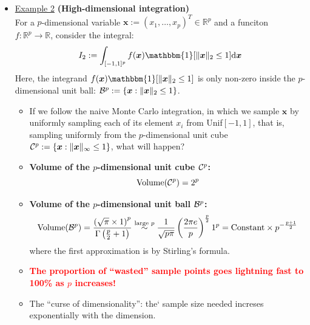 \documentclass[12pt]{article}
\begin{document}
\begin{itemize}
	\item \underline{Example 2} {\bf (High-dimensional integration)}\\
	For a $p$-dimensional variable $\bm{x}:=(x_1, \ldots, x_p)^T\in\mathbb{R}^p$ and a funciton $f:\mathbb{R}^p\to\mathbb{R}$, consider the integral:
	$$
	I_2:= \int_{[-1,1]^p} f(\bm{x})\mathbbm{1}[\|\bm{x}\|_2\leq 1] \textrm{d}\bm{x}
	$$
	Here, the integrand $f(\bm{x})\mathbbm{1}[\|\bm{x}\|_2\leq 1]$ is only non-zero inside the $p$-dimensional unit ball: ${\cal B}^p:=\{\bm{x}: \|\bm{x}\|_2\leq 1\}$.
	\begin{itemize}[label=*]
		\item If we follow the naive Monte Carlo integration, in which we sample $\bm{x}$ by uniformly sampling each of its element $x_i$ from Unif$[-1, 1]$, that is, sampling uniformly from the $p$-dimensional unit cube ${\cal C}^p:=\{ \bm{x}: \|\bm{x}\|_\infty\leq 1 \}$, what will happen?
		\item {\bf Volume of the $p$-dimensional unit cube ${\cal C}^p$:}
		$$
		\textrm{Volume}({\cal C}^p) = 2^p
		$$
		\item {\bf Volume of the $p$-dimensional unit ball ${\cal B}^p$:}
		$$
		\textrm{Volume}({\cal B}^p) = \frac{\left(\sqrt{\pi}\times 1\right)^p}{\Gamma\left(\frac{p}{2}+1\right)} \stackrel{\textrm{large }p}{\sim} \frac{1}{\sqrt{p\pi}}\left(\frac{2\pi e}{p}\right)^{\frac{p}{2}} 1^p = \textrm{Constant}\times p^{-\frac{p+1}{2}}
		$$
		where the first approximation is by Stirling's formula.
		\item \textcolor{red}{\bf The proportion of ``wasted'' sample points goes lightning fast to 100\% as $p$ increases!}
		\item The ``curse of dimensionality'': the` sample size needed increses exponentially with the dimension.
	\end{itemize}
\end{itemize}
\end{document}
